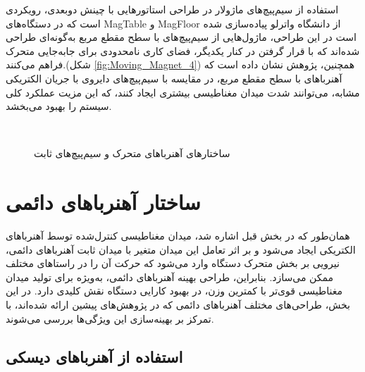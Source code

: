 استفاده از سیم‌پیچ‌های ماژولار در طراحی استاتورهایی با چینش دوبعدی، رویکردی است که در دستگاه‌های MagTable و MagFloor از دانشگاه واترلو پیاده‌سازی شده است
\cite{RN8,RN30,RN10}
 در این طراحی، ماژول‌هایی از سیم‌پیچ‌های با سطح مقطع مربع به‌گونه‌ای طراحی شده‌اند که با قرار گرفتن در کنار یکدیگر، فضای کاری نامحدودی برای جابه‌جایی متحرک فراهم می‌کنند.(شکل
\ref{fig:Moving_Magnet_4})
 همچنین، پژوهش
\cite{RN8}
 نشان داده است که آهنرباهای با سطح مقطع مربع، در مقایسه با سیم‌پیچ‌های دایروی با جریان الکتریکی مشابه، می‌توانند شدت میدان مغناطیسی بیشتری ایجاد کنند، که این مزیت عملکرد کلی سیستم را بهبود می‌بخشد.

\begin{figure}[ht]
\centering 
{}
\hspace{2mm}
\\ %
\hspace{2mm}
\label{fig:Moveing_Magnet} %
\caption{ساختارهای آهنرباهای متحرک و سیم‌پیچ‌های ثابت}
\end{figure}








\section{ساختار آهنرباهای دائمی}

همان‌طور که در بخش قبل اشاره شد، میدان مغناطیسی کنترل‌شده توسط آهنرباهای الکتریکی ایجاد می‌شود و بر اثر تعامل این میدان متغیر با میدان ثابت آهنرباهای دائمی، نیرویی بر بخش متحرک دستگاه وارد می‌شود که حرکت آن را در راستاهای مختلف ممکن می‌سازد. بنابراین، طراحی بهینه آهنرباهای دائمی، به‌ویژه برای تولید میدان مغناطیسی قوی‌تر با کمترین وزن، در بهبود کارایی دستگاه نقش کلیدی دارد. در این بخش، طراحی‌های مختلف آهنرباهای دائمی که در پژوهش‌های پیشین ارائه شده‌اند، با تمرکز بر بهینه‌سازی این ویژگی‌ها بررسی می‌شوند.
\subsection{استفاده از آهنرباهای دیسکی}

